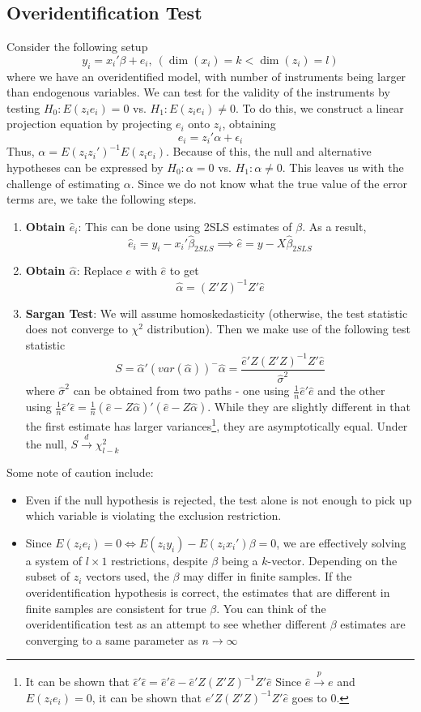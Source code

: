\documentclass[12pt]{article}
\theoremstyle{definition}
\theoremstyle{property}
\theoremstyle{assumption}
\theoremstyle{example}
\theoremstyle{comment}
\begin{document}
\subsection{Overidentification Test}
Consider the following setup
\[
y_i = x_i'\beta+e_i, \ (\dim(x_i)=k<\dim(z_i)=l) 
\]
where we have an overidentified model, with number of instruments being larger than endogenous variables. We can test for the validity of the instruments by testing $H_0: E(z_ie_i)=0$ vs. $H_1: E(z_ie_i)\neq0$. To do this, we construct a linear projection equation by projecting $e_i$ onto $z_i$, obtaining
\[
e_i=z_i'\alpha+\epsilon_i
\]
Thus, $\alpha=E(z_iz_i')^{-1}E(z_ie_i)$. Because of this, the null and alternative hypotheses can be expressed by $H_0: \alpha=0$ vs. $H_1: \alpha\neq0$. This leaves us with the challenge of estimating $\alpha$.  Since we do not know what the true value of the error terms are, we take the following steps.
\begin{enumerate}
\item \textbf{Obtain $\hat{e}_i$}: This can be done using 2SLS estimates of $\beta$. As a result, 
\[
\hat{e}_i = y_i-x_i'\hat{\beta}_{2SLS} \implies \hat{e}=y-X\hat{\beta}_{2SLS}
\]
\item \textbf{Obtain $\hat{\alpha}$}: Replace $e$ with $\hat{e}$ to get
\[
\hat{\alpha} = (Z'Z)^{-1}Z'\hat{e}
\]
\item \textbf{Sargan Test}: We will assume homoskedasticity (otherwise, the test statistic does not converge to $\chi^2$ distribution). Then we make use of the following test statistic
\[
S=\hat{\alpha}'(var(\hat{\alpha}))^{-}\hat{\alpha}=\frac{\hat{e}'Z(Z'Z)^{-1}Z'\hat{e}}{\hat{\sigma}^2}
\]
where $\hat{\sigma}^2$ can be obtained from two paths - one using $\frac{1}{n}\hat{e}'\hat{e}$ and the other using $\frac{1}{n}\hat{\epsilon}'\hat{\epsilon}=\frac{1}{n}(\hat{e}-Z\hat{\alpha})'(\hat{e}-Z\hat{\alpha})$. While they are slightly different in that the first estimate has larger variances\footnote{It can be shown that $\hat{\epsilon}'\hat{\epsilon}=\hat{e}'\hat{e}-\hat{e}'Z(Z'Z)^{-1}Z'\hat{e}$ Since $\hat{e}\xrightarrow{p}e$ and $E(z_ie_i)=0$, it can be shown that $\hat{e}'Z(Z'Z)^{-1}Z'\hat{e}$ goes to 0.}, they are asymptotically equal. Under the null, $S\xrightarrow{d}\chi_{l-k}^2$
\end{enumerate}
Some note of caution include:
\begin{itemize}
\item Even if the null hypothesis is rejected, the test alone is not enough to pick up which variable is violating the exclusion restriction.
\item Since $E(z_ie_i)=0\iff E(z_iy_i)-E(z_ix_i')\beta=0$, we are effectively solving a system of $l\times 1$ restrictions, despite $\beta$ being a $k$-vector. Depending on the subset of $z_i$ vectors used, the $\beta$ may differ in finite samples. If the overidentification hypothesis is correct, the estimates that are different in finite samples are consistent for true $\beta$. You can think of the overidentification test as an attempt to see whether different $\beta$ estimates are converging to a same parameter as $n\to\infty$ 
\end{itemize}
\end{document}
